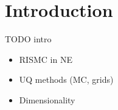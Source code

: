 \section{Introduction}
TODO intro
\begin{itemize}
  \item RISMC in NE
  \item UQ methods (MC, grids)
  \item Dimensionality
\end{itemize}
